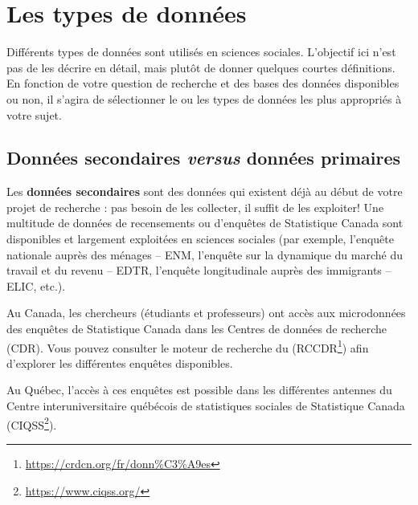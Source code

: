 \documentclass[
  11pt,
  french,
]{book}
\makeatletter
\renewcommand{\href}[2]{#2\footnote{\url{#1}}}
\newenvironment{kframev}{%
\medskip{}
\setlength{\fboxsep}{.8em}
 \def\at@end@of@kframev{}%
 \ifinner\ifhmode%
  \def\at@end@of@kframev{\end{minipage}}%
  \begin{minipage}{\columnwidth}%
 \fi\fi%
 \def\FrameCommand##1{\hskip\@totalleftmargin \hskip-\fboxsep
 \colorbox{shadebluecolor}{##1}\hskip-\fboxsep
     \hskip-\linewidth \hskip-\@totalleftmargin \hskip\columnwidth}%
 \MakeFramed {\advance\hsize-\width
   \@totalleftmargin\z@ \linewidth\hsize
   \@setminipage}}%
 {\par\unskip\endMakeFramed%
 \at@end@of@kframev}
\newenvironment{rmdblock}[1]
  {
  \begin{itemize}
  \renewcommand{\labelitemi}{
    \raisebox{-.7\height}[0pt][0pt]{
      {\setkeys{Gin}{width=3em,keepaspectratio}\texttt{[image: images/\#1]}}
    }
  }
  \setlength{\fboxsep}{1em}
  \begin{kframev}
  \small
  \item
  }
  {
  \end{kframev}
  \end{itemize}
  }
\newenvironment{bloc_notes}
  {\begin{rmdblock}{notes}}
  {\end{rmdblock}}
\makeatother
\begin{document}
\hypertarget{sect022}{%
\section{Les types de données}\label{sect022}}

Différents types de données sont utilisés en sciences sociales. L'objectif ici n'est pas de les décrire en détail, mais plutôt de donner quelques courtes définitions. En fonction de votre question de recherche et des bases des données disponibles ou non, il s'agira de sélectionner le ou les types de données les plus appropriés à votre sujet.

\hypertarget{sect0221}{%
\subsection{\texorpdfstring{Données secondaires \emph{versus} données primaires}{Données secondaires versus données primaires}}\label{sect0221}}

Les \textbf{données secondaires} sont des données qui existent déjà au début de votre projet de recherche : pas besoin de les collecter, il suffit de les exploiter! Une multitude de données de recensements ou d'enquêtes de Statistique Canada sont disponibles et largement exploitées en sciences sociales (par exemple, l'enquête nationale auprès des ménages -- ENM, l'enquête sur la dynamique du marché du travail et du revenu -- EDTR, l'enquête longitudinale auprès des immigrants -- ELIC, etc.).

\begin{bloc_notes}
Au Canada, les chercheurs (étudiants et professeurs) ont accès aux microdonnées des enquêtes de Statistique Canada dans les Centres de données de recherche (CDR). Vous pouvez consulter le moteur de recherche du (\href{https://crdcn.org/fr/donn\%C3\%A9es}{RCCDR}) afin d'explorer les différentes enquêtes disponibles.

Au Québec, l'accès à ces enquêtes est possible dans les différentes antennes du Centre interuniversitaire québécois de statistiques sociales de Statistique Canada (\href{https://www.ciqss.org/}{CIQSS}).

\end{bloc_notes}
\end{document}
